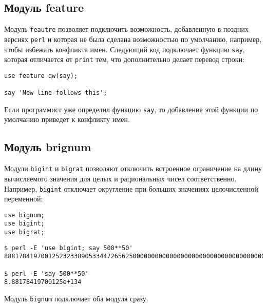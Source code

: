 \subsection{Модуль feature} %
Модуль \verb|feautre| позволяет подключить возможность, добавленную в поздних версиях \verb|perl| и которая не была сделана возможностью по умолчанию, например, чтобы избежать конфликта имен. Следующий код подключает функцию \verb|say|, которая отличается от \verb|print| тем, что дополнительно делает перевод строки:
\begin{verbatim}
use feature qw(say);

say 'New line follows this';
\end{verbatim}
Если программист уже определил функцию \verb|say|, то добавление этой функции по умолчанию приведет к конфликту имен.

\subsection{Модуль brignum} %
Модули \verb|bigint| и \verb|bigrat| позволяют отключить встроенное ограничение на длину вычисляемого значения для целых и рациональных чисел соответственно. Например, \verb|bigint| отключает округление при больших значениях целочисленной переменной:
\begin{verbatim}
use bignum;
use bigint;
use bigrat;
\end{verbatim}
\begin{verbatim}
$ perl -E 'use bigint; say 500**50'
888178419700125232338905334472656250000000000000000000000000000000000000000000000000000000000000000000000000000000000000000000000000000

$ perl -E 'say 500**50'
8.88178419700125e+134
\end{verbatim}
Модуль \verb|bignum| подключает оба модуля сразу.

